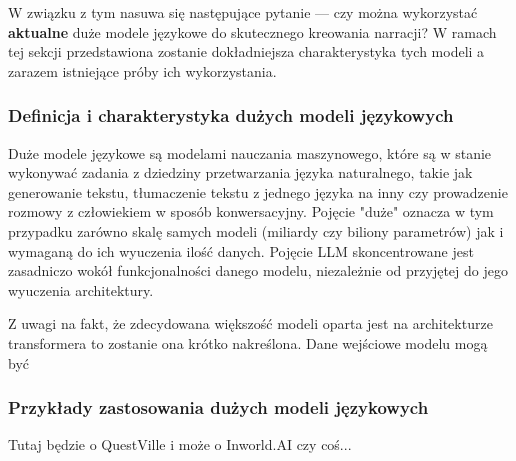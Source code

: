 W związku z tym nasuwa się następujące pytanie --- czy można wykorzystać \textbf{aktualne} duże modele
językowe do skutecznego kreowania narracji? W ramach tej sekcji przedstawiona zostanie dokładniejsza
charakterystyka tych modeli a zarazem istniejące próby ich wykorzystania.

\subsubsection*{Definicja i charakterystyka dużych modeli językowych}

Duże modele językowe są modelami nauczania maszynowego, które są w stanie wykonywać zadania z dziedziny
przetwarzania języka naturalnego, takie jak generowanie tekstu, tłumaczenie tekstu z jednego języka
na inny czy prowadzenie rozmowy z człowiekiem w sposób konwersacyjny\cite{larp_language}. Pojęcie
"duże" oznacza w tym przypadku zarówno skalę samych modeli (miliardy czy biliony parametrów) jak i
wymaganą do ich wyuczenia ilość danych. Pojęcie LLM skoncentrowane jest zasadniczo wokół funkcjonalności
danego modelu, niezależnie od przyjętej do jego wyuczenia architektury.

Z uwagi na fakt, że zdecydowana większość modeli oparta jest na architekturze transformera to zostanie
ona krótko nakreślona. Dane wejściowe modelu mogą być

\subsubsection*{Przykłady zastosowania dużych modeli językowych}

Tutaj będzie o QuestVille i może o Inworld.AI czy coś...
